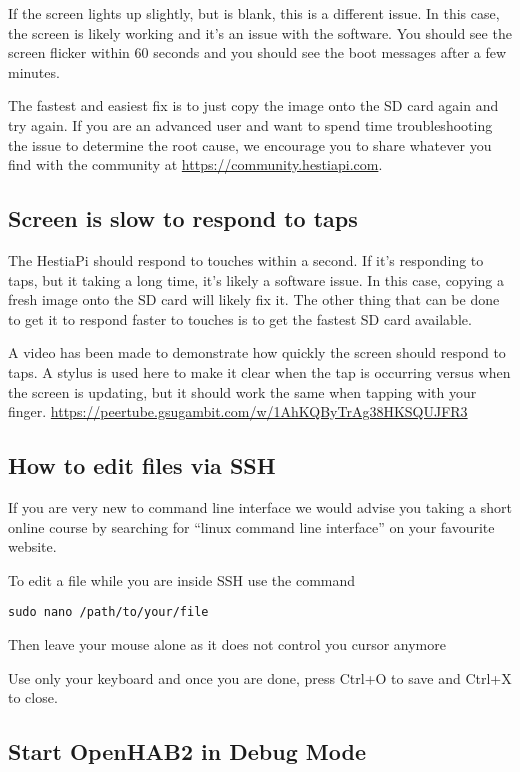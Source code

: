 If the screen lights up slightly, but is blank, this is a different issue. In
this case, the screen is likely working and it's an issue with the software.
You should see the screen flicker within 60 seconds and you should see the
boot messages after a few minutes.

The fastest and easiest fix is to just copy the image onto the SD card again
and try again. If you are an advanced user and want to spend time
troubleshooting the issue to determine the root cause, we encourage you to
share whatever you find with the community at
\url{https://community.hestiapi.com}.

\subsection{Screen is slow to respond to taps}
The HestiaPi should respond to touches within a second. If it's responding
to taps, but it taking a long time, it's likely a software issue. In this
case, copying a fresh image onto the SD card will likely fix it. The other
thing that can be done to get it to respond faster to touches is to get the
fastest SD card available.

A video has been made to demonstrate how quickly the screen should respond to
taps. A stylus is used here to make it clear when the tap is occurring versus
when the screen is updating, but it should work the same when tapping with your
finger. \url{https://peertube.gsugambit.com/w/1AhKQByTrAg38HKSQUJFR3}

\subsection{How to edit files via SSH}
If you are very new to command line interface we would advise you taking a
short online course by searching for ``linux command line interface'' on your
favourite website.

To edit a file while you are inside SSH use the command

\texttt{sudo nano /path/to/your/file}

Then leave your mouse alone as it does not control you cursor anymore

Use only your keyboard and once you are done, press Ctrl+O to save and Ctrl+X to close.

\subsection{Start OpenHAB2 in Debug Mode}

